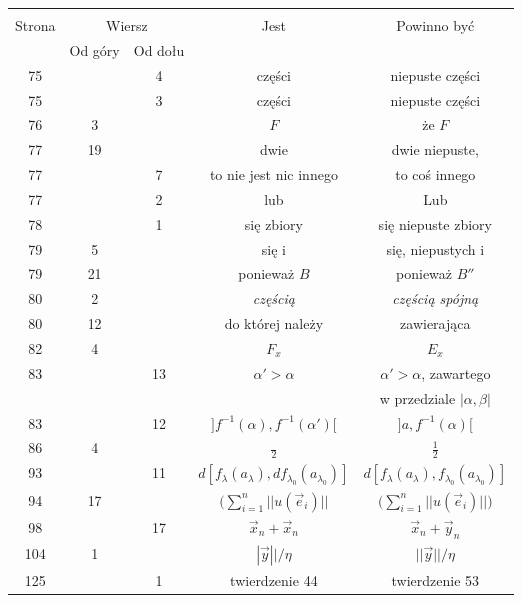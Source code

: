 \documentclass[a4paper]{article}
\newcommand{\fr}{\frac}
\newcommand{\Sum}{\sum\limits}
\newcommand{\al}{\alpha}
\newcommand{\be}{\beta}
\newcommand{\la}{\lambda}
\begin{document}
\begin{center}
  \begin{tabular}{|c|c|c|c|c|}
    \hline
    & \multicolumn{2}{c|}{} & & \\
    Strona & \multicolumn{2}{c|}{Wiersz}& Jest & Powinno być \\ \cline{2-3}
    & Od góry & Od dołu &  &  \\ \hline
    75 & & 4 & części & niepuste części \\
    75 & & 3 & części & niepuste części \\
    76 & 3 & & $F$ & że $F$ \\
    77 & 19 & & dwie & dwie niepuste, \\
    77 & & 7 & to nie jest nic innego & to coś innego \\
    77 & & 2 & lub & Lub \\
    78 & & 1 & się zbiory & się niepuste zbiory \\
    79 & 5 & & się i & się, niepustych i \\
    79 & 21 & & ponieważ $B$ & ponieważ $B''$ \\
    80 & 2 & & \emph{częścią} & \emph{częścią spójną} \\
    80 & 12 & & do której należy & zawierająca \\
    82 & 4 & & $F_{ x }$ & $E_{ x }$ \\
    83 & & 13 & $\al' > \al$ & $\al' > \al$, zawartego \\
    & & & & w przedziale $| \al, \be |$ \\
    83 & & 12 & $] f^{ - 1 }( \al ), f^{ -1 }( \al' ) [$
           & $] a, f^{ -1 }( \al ) [$ \\
    86 & 4 & & $\fr{ }{ 2 }$ & $\fr{ 1 }{ 2 }$ \\
    93 & & 11 & $d[ f_{ \la }( a_{ \la } ), df_{ \la_{ 0 } }
                ( a_{ \la_{ 0 } } ) ]$
           & $d[ f_{ \la }( a_{ \la } ), f_{ \la_{ 0 } }
             ( a_{ \la_{ 0 } } ) ]$ \\
    94 & 17 & & $\big( \Sum_{ i = 1 }^{ n } | | u( \vec{ e }_{ i } ) | |$
           & $\big( \sum_{ i = 1 }^{ n }
             | | u( \vec{ e }_{ i } ) | | \big)$ \\
    98 & & 17 & $\vec{ x }_{ n } + \vec{ x }_{ n }$ & $\vec{ x }_{ n }
                                                      + \vec{ y }_{ n }$ \\
    104 & 1 & & $| \vec{ y } || / \eta$ & $|| \vec{ y } || / \eta$ \\
    125 & & 1 & twierdzenie 44 & twierdzenie 53 \\

\end{tabular}
\end{center}
\end{document}
